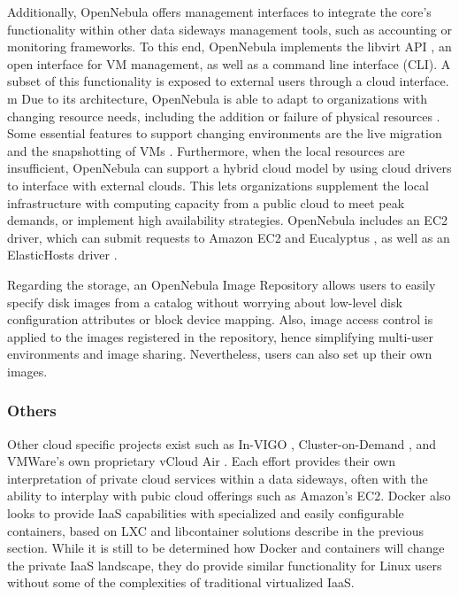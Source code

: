 Additionally, OpenNebula offers management interfaces to integrate the core's functionality within other data sideways management tools, such as accounting or monitoring frameworks. To this end, OpenNebula implements the libvirt API \cite{www/libvirt}, an open interface for VM management, as well as a command line interface (CLI). A subset of this functionality is exposed to external users through a cloud interface.
m
Due to its architecture, OpenNebula is able to adapt to organizations with changing re­source needs, including the addition or failure of physical resources \cite{sotomayorvirtual}. Some essential features to support changing environments are the live migration and the snapshotting of VMs \cite{www/opennebula}. Furthermore, when the local resources are insufficient, OpenNebula can support a hybrid cloud model by using cloud drivers to inter­face with external clouds. This lets organizations supplement the local infrastructure with computing capacity from a public cloud to meet peak demands, or implement high availability strategies. OpenNebula includes an EC2 driver, which can submit requests to Amazon EC2 and Eucalyptus \cite{nurmi2008eos}, as well as an ElasticHosts driver \cite{www/elastichosts}.

Regarding the storage, an OpenNebula Image Repository allows users to easily specify disk images from a catalog without worrying about low-level disk configuration attributes or block device mapping. Also, image access control is applied to the images registered in the repository, hence simplifying multi-user environments and image sharing. Nevertheless, users can also set up their own images. 


\subsubsection{Others}

Other cloud specific projects exist such as In-VIGO \cite{adabala2005virtualized}, Cluster-on-Demand \cite{chase2003dvc}, and VMWare's own proprietary vCloud Air \cite{www-vmware-vcloud}.  Each effort provides their own interpretation of private cloud services within a data sideways, often with the ability to interplay with pubic cloud offerings such as Amazon's EC2. Docker \cite{merkel2014docker} also looks to provide IaaS capabilities with specialized and easily configurable containers, based on LXC and libcontainer solutions describe in the previous section. While it is still to be determined how Docker and containers will change the private IaaS landscape, they do provide similar functionality for Linux users without some of the complexities of traditional virtualized IaaS.  



